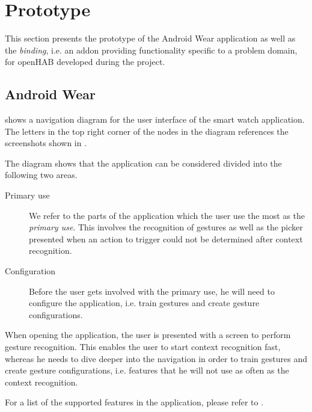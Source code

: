 \section{Prototype}
\label{sec:implementation:prototype}

This section presents the prototype of the Android Wear application as well as the \emph{binding}, i.e. an addon providing functionality specific to a problem domain, for openHAB developed during the project.

\subsection{Android Wear}
\label{sec:implementation:prototype:android-wear}

 shows a navigation diagram for the user interface of the smart watch application. The letters in the top right corner of the nodes in the diagram references the screenshots shown in .

The diagram shows that the application can be considered divided into the following two areas.

\begin{description}
\item[Primary use] We refer to the parts of the application which the user use the most as the \emph{primary use}. This involves the recognition of gestures as well as the picker presented when an action to trigger could not be determined after context recognition.
\item[Configuration] Before the user gets involved with the primary use, he will need to configure the application, i.e. train gestures and create gesture configurations.
\end{description}

When opening the application, the user is presented with a screen to perform gesture recognition. This enables the user to start context recognition fast, whereas he needs to dive deeper into the navigation in order to train gestures and create gesture configurations, i.e. features that he will not use as often as the context recognition.

For a list of the supported features in the application, please refer to .

